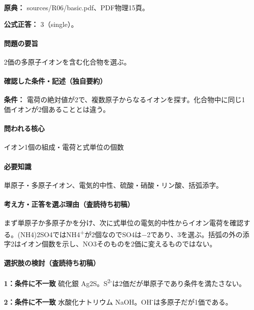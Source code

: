 \noindent\textbf{原典：} sources/R06/basic.pdf、PDF物理15頁。

\textbf{公式正答：} 3（single）。

\paragraph{問題の要旨} 2価の多原子イオンを含む化合物を選ぶ。

\paragraph{確認した条件・記述（独自要約）}\mbox{}\par

\noindent\textbf{条件：} 電荷の絶対値が2で、複数原子からなるイオンを探す。化合物中に同じ1価イオンが2個あることとは違う。\par

\paragraph{問われる核心} イオン1個の組成・電荷と式単位の個数

\paragraph{必要知識} 単原子・多原子イオン、電気的中性、硫酸・硝酸・リン酸、括弧添字。

\paragraph{考え方・正答を選ぶ理由（査読待ち初稿）} まず単原子か多原子かを分け、次に式単位の電気的中性からイオン電荷を確認する。(NH4)2SO4ではNH4\textsuperscript{+}が2個なのでSO4は−2であり、3を選ぶ。括弧の外の添字2はイオン個数を示し、NO3そのものを2価に変えるものではない。

\paragraph{選択肢の検討（査読待ち初稿）}\mbox{}\par

\noindent\textbf{1：条件に不一致} 硫化銀 Ag2S。S\textsuperscript{2-}は2価だが単原子であり条件を満たさない。\par

\noindent\textbf{2：条件に不一致} 水酸化ナトリウム NaOH。OH\textsuperscript{-}は多原子だが1価である。\par

